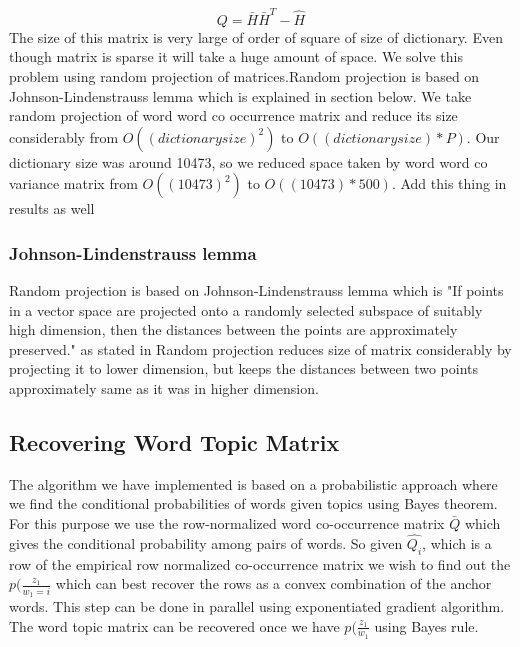 \documentclass[a4paper,11pt]{article}
\begin{document}
\begin{equation}
Q = \bar{H} \bar{H}^T - \hat{H}
\end{equation}
The size of this matrix is very large of order of square of size of dictionary. Even though matrix is sparse it will take a huge amount of space. We solve this problem using random projection of matrices.Random projection is based on Johnson-Lindenstrauss lemma which is explained in section below. We take random projection of word word co occurrence matrix and reduce its size considerably from $O((dictionary size)^2)$ to $O((dictionary size)*P)$. Our dictionary size was around 10473, so we reduced space taken by word word co variance matrix from $O((10473)^2)$ to $O((10473)*500)$. {\color{orange} Add this thing in results as well}
\subsubsection{Johnson-Lindenstrauss lemma}
Random projection is based on Johnson-Lindenstrauss lemma which is "If points in a vector space are projected onto a randomly selected subspace of suitably high dimension, then the distances between the points are approximately preserved." as stated in \cite{randomProjection} Random projection reduces size of matrix considerably by projecting it to lower dimension, but keeps the distances between two points approximately same as it was in higher dimension.


\subsection{Recovering Word Topic Matrix}
The algorithm we have implemented is based on a probabilistic approach where we find the conditional probabilities of words given topics using Bayes theorem. For this purpose we use the row-normalized word co-occurrence matrix $\bar{Q}$ which gives the conditional probability among pairs of words. So given $\hat{Q_{i}}$, which is a row of the empirical row normalized co-occurrence matrix we wish to find out the $p(\frac{z_{1}}{w_{1}=i}$ which can best recover the rows as a convex combination of the anchor words. This step can be done in parallel using exponentiated gradient algorithm. The word topic matrix can be recovered once we have $p(\frac{z_{1}}{w_{1}}$ using Bayes rule. 
\end{document}
